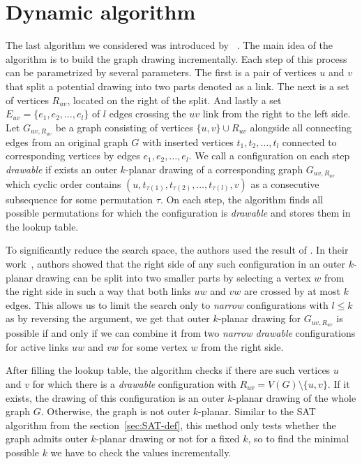
\section{Dynamic algorithm}

The last algorithm we considered was introduced by \citeauthor{okp}~\cite{okp}. The main idea of the algorithm is to build the graph drawing incrementally. Each step of this process can be parametrized by several parameters. The first is a pair of vertices \(u\) and \(v\) that split a potential drawing into two parts denoted as a link. The next is a set of vertices \(R_{uv}\), located on the right of the split. And lastly a set \(E_{uv} = \{e_1, e_2, \dots, e_l\}\) of \(l\) edges crossing the \(uv\) link from the right to the left side. Let \(G_{uv, R_{uv}}\) be a graph consisting of vertices \(\{u, v\} \cup R_{uv}\) alongside all connecting edges  from an original graph \(G\) with inserted vertices \(t_1, t_2, \dots, t_l\) connected to corresponding vertices by edges \(e_1, e_2, \dots, e_l\). We call a configuration on each step \emph{drawable} if exists an outer \(k\)-planar drawing of a corresponding graph \(G_{uv, R_{uv}}\) which cyclic order contains \((u, t_{\tau(1)}, t_{\tau(2)}, \dots, t_{\tau(l)}, v)\) as a consecutive subsequence for some permutation \(\tau\). On each step, the algorithm finds all possible permutations for which the configuration is \emph{drawable} and stores them in the lookup table.

To significantly reduce the search space, the authors used the result of \citeauthor{triangulations}. In their work~\cite{triangulations}, authors showed that the right side of any such configuration in an outer \(k\)-planar drawing can be split into two smaller parts by selecting a vertex \(w\) from the right side in such a way that both links \(uw\) and \(vw\) are crossed by at most \(k\) edges. This allows us to limit the search only to \emph{narrow} configurations with \(l \leqslant k\) as by reversing the argument, we get that outer \(k\)-planar drawing for \(G_{uv, R_{uv}}\) is possible if and only if we can combine it from two \emph{narrow drawable} configurations for active links \(uw\) and \(vw\) for some vertex \(w\) from the right side.

After filling the lookup table, the algorithm checks if there are such vertices \(u\) and \(v\) for which there is a \emph{drawable} configuration with \(R_{uv} = V(G)\setminus\{u, v\}\). If it exists, the drawing of this configuration is an outer \(k\)-planar drawing of the whole graph \(G\). Otherwise, the graph is not outer \(k\)-planar. Similar to the SAT algorithm from the section~\ref{sec:SAT-def}, this method only tests whether the graph admits outer \(k\)-planar drawing or not for a fixed \(k\), so to find the minimal possible \(k\) we have to check the values incrementally.

